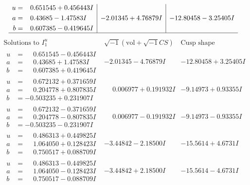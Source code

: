 \documentclass[1p]{elsarticle_modified}
\theoremstyle{definition}
\newcommand{\I}{\sqrt{-1}}
\begin{document}
$$\begin{array}{c|c|c}
\begin{aligned}
u &= \phantom{-}0.651545 + 0.456443 I \\
a &= \phantom{-}0.43685 - 1.47583 I \\
b &= \phantom{-}0.607385 - 0.419645 I\end{aligned}
 & -2.01345 + 4.76879 I & -12.80458 - 3.25405 I\\
 \hline 
 \end{array}$$\newpage$$\begin{array}{c|c|c}  
\text{Solutions to }I^u_{1}& \I (\text{vol} + \sqrt{-1}CS) & \text{Cusp shape}\\
 \hline 
\begin{aligned}
u &= \phantom{-}0.651545 - 0.456443 I \\
a &= \phantom{-}0.43685 + 1.47583 I \\
b &= \phantom{-}0.607385 + 0.419645 I\end{aligned}
 & -2.01345 - 4.76879 I & -12.80458 + 3.25405 I \\ \hline\begin{aligned}
u &= \phantom{-}0.672132 + 0.371659 I \\
a &= \phantom{-}0.204778 + 0.807835 I \\
b &= -0.503235 + 0.231907 I\end{aligned}
 & \phantom{-}0.006977 + 0.191932 I & -9.14973 + 0.93355 I \\ \hline\begin{aligned}
u &= \phantom{-}0.672132 - 0.371659 I \\
a &= \phantom{-}0.204778 - 0.807835 I \\
b &= -0.503235 - 0.231907 I\end{aligned}
 & \phantom{-}0.006977 - 0.191932 I & -9.14973 - 0.93355 I \\ \hline\begin{aligned}
u &= \phantom{-}0.486313 + 0.449825 I \\
a &= \phantom{-}1.064050 + 0.128423 I \\
b &= \phantom{-}0.750517 + 0.088709 I\end{aligned}
 & -3.44842 - 2.18500 I & -15.5614 + 4.6731 I \\ \hline\begin{aligned}
u &= \phantom{-}0.486313 - 0.449825 I \\
a &= \phantom{-}1.064050 - 0.128423 I \\
b &= \phantom{-}0.750517 - 0.088709 I\end{aligned}
 & -3.44842 + 2.18500 I & -15.5614 - 4.6731 I \\ \hline\begin{aligned}

\end{aligned}
\end{array}$$
\end{document}
